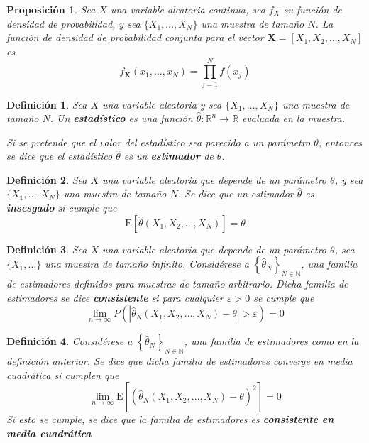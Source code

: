 \documentclass[12pt,letterpaper]{book}
\newtheorem{definicion}{Definición}[chapter]
\newtheorem{proposicion}[teorema]{Proposición}
\newcommand{\R}{\mathbb{R}}
\newcommand{\N}{\mathbb{N}}
\newcommand{\E}[1]{\mathrm{E}\left[ #1 \right]}
\newcommand{\abso}[1]{\left| #1 \right|}
\begin{document}
\begin{proposicion}
\label{oculto1}
Sea $X$ una variable aleatoria continua, sea $f_X$ su función de densidad de probabilidad, y sea $\{ X_1, \dots, X_N \}$ una muestra de tamaño $N$. 
%
La función de densidad de probabilidad conjunta para el vector $\boldsymbol{X}=[ X_1, X_2, \dots, X_N ]$ es
\begin{equation}
f_{\boldsymbol{X}}(x_1, \dots, x_N ) = \prod_{j=1}^{N} f(x_j)
\end{equation}
\end{proposicion}

\newpage

\begin{definicion}
Sea $X$ una variable aleatoria y sea $\{ X_1, \dots, X_N \}$ una muestra de tamaño $N$.
%
Un \textbf{estadístico} es una función $\widehat{\theta}: \R^{n}\rightarrow\R$ evaluada en la muestra.

Si se pretende que el valor del estadístico sea \textit{parecido} a un parámetro $\theta$, entonces se dice que el estadístico $\widehat{\theta}$ es un \textbf{estimador} de $\theta$.
\end{definicion}

\begin{definicion}
Sea $X$ una variable aleatoria que depende de un parámetro $\theta$, y sea $\{ X_1, \dots, X_N \}$ una muestra de tamaño $N$. Se dice que un estimador $\widehat{\theta}$ es \textbf{insesgado} si cumple que
\begin{equation}
\E{\widehat{\theta}(X_1,X_2,\dots,X_N)} = \theta
\end{equation}
\end{definicion}

\begin{definicion}
Sea $X$ una variable aleatoria que depende de un parámetro $\theta$, sea $\{ X_1, \dots\}$ una muestra de tamaño infinito.
%
Considérese a $\left\{ \widehat{\theta}_N \right\}_{N\in \N}$, una familia de estimadores definidos para muestras de tamaño arbitrario. 
%
Dicha familia de estimadores se dice \textbf{consistente} si para cualquier $\varepsilon > 0$ se cumple que
\begin{equation}
\lim_{n\rightarrow\infty} P\left( \abso{\widehat{\theta}_N(X_1,X_2,\dots,X_N)-\theta} > \varepsilon \right) = 0
\end{equation}
\end{definicion}

\begin{definicion}
Considérese a $\left\{ \widehat{\theta}_N \right\}_{N\in \N}$, una familia de estimadores como en la definición anterior.
%
Se dice que dicha familia de estimadores \textit{converge en media cuadrática} si cumplen que
\begin{equation}
\lim_{n\rightarrow\infty} \E{\left( \widehat{\theta}_N(X_1,X_2,\dots,X_N) - \theta \right)^{2}} = 0
\end{equation}
Si esto se cumple, se dice que la familia de estimadores es \textbf{consistente en media cuadrática} \end{definicion}
\end{document}
